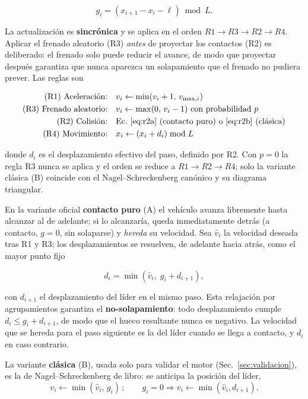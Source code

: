 \documentclass[11pt,a4paper]{article}
\begin{document}
\begin{equation}
g_i = \left(x_{i+1} - x_i - \ell\right) \bmod L .
\label{eq:gap}
\end{equation}

La actualización es \textbf{sincrónica} y se aplica en el orden
$R1 \to R3 \to R2 \to R4$. Aplicar el frenado aleatorio (R3) \emph{antes} de proyectar
los contactos (R2) es deliberado: el frenado solo puede reducir el avance, de modo que
proyectar después garantiza que nunca aparezca un solapamiento que el frenado no
pudiera prever. Las reglas son

\begin{align}
\text{(R1) Aceleración:}\quad & v_i \leftarrow \min(v_i + 1,\, v_{\max,i}) \label{eq:r1}\\
\text{(R3) Frenado aleatorio:}\quad & v_i \leftarrow \max(0,\, v_i - 1)\ \text{con probabilidad } p \label{eq:r3}\\
\text{(R2) Colisión:}\quad & \text{Ec.~\eqref{eq:r2a} (contacto puro) o \eqref{eq:r2b} (clásica)} \nonumber\\
\text{(R4) Movimiento:}\quad & x_i \leftarrow (x_i + d_i) \bmod L \label{eq:r4}
\end{align}

donde $d_i$ es el desplazamiento efectivo del paso, definido por R2. Con $p=0$ la regla
R3 nunca se aplica y el orden se reduce a $R1\to R2\to R4$; solo la variante clásica
(B) coincide con el Nagel--Schreckenberg canónico y su diagrama triangular.

En la variante oficial \textbf{contacto puro} (A) el vehículo avanza libremente hasta
alcanzar al de adelante; si lo alcanzaría, queda inmediatamente detrás (a contacto,
$g=0$, sin solaparse) y \emph{hereda} su velocidad. Sea $\hat v_i$ la velocidad deseada
tras R1 y R3; los desplazamientos se resuelven, de adelante hacia atrás, como el mayor
punto fijo

\begin{equation}
d_i = \min\!\left(\hat v_i,\; g_i + d_{i+1}\right),
\label{eq:r2a}
\end{equation}

con $d_{i+1}$ el desplazamiento del líder en el mismo paso. Esta relajación por
agrupamientos garantiza el \textbf{no-solapamiento}: todo desplazamiento cumple
$d_i \le g_i + d_{i+1}$, de modo que el hueco resultante nunca es negativo. La velocidad
que se hereda para el paso siguiente es la del líder cuando se llega a contacto, y $d_i$
en caso contrario.

La variante \textbf{clásica} (B), usada solo para validar el motor
(Sec.~\ref{sec:validacion}), es la de Nagel--Schreckenberg de libro: se anticipa la
posición del líder,
\begin{equation}
v_i \leftarrow \min(\hat v_i,\, g_i)\,;\qquad g_i=0 \Rightarrow v_i \leftarrow \min(\hat v_i, d_{i+1}).
\label{eq:r2b}
\end{equation}
\end{document}
